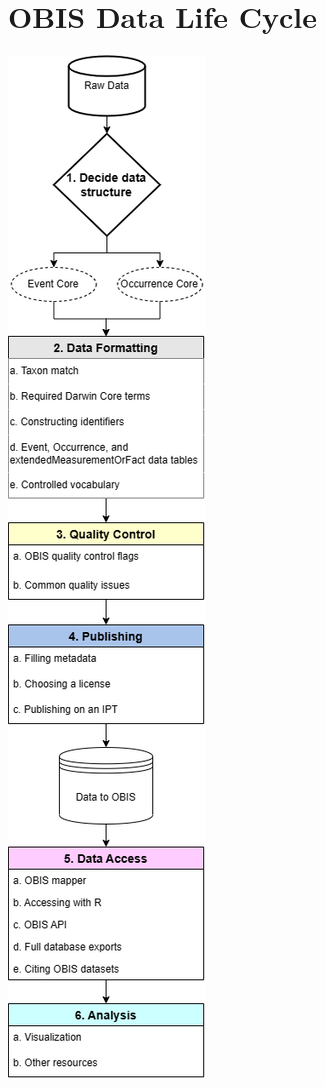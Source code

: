 \documentclass[
  letterpaper,
  DIV=11,
  numbers=noendperiod,
  oneside]{scrreprt}
\begin{document}
\hypertarget{obis-data-life-cycle}{%
\section{OBIS Data Life Cycle}\label{obis-data-life-cycle}}

\begin{marginfigure}

{\centering \includegraphics{images/OBISdataLifeCycle.png}

}

\end{marginfigure}
\end{document}
